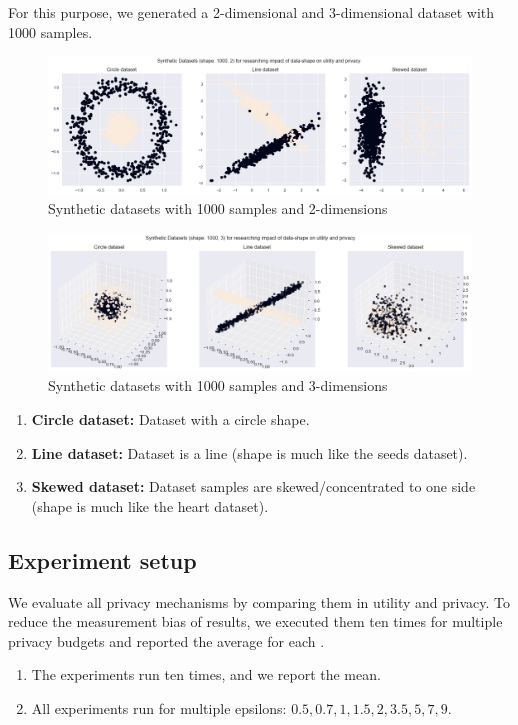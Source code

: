 For this purpose, we generated a 2-dimensional and 3-dimensional dataset with 1000 samples.
\begin{figure}[H]
      \includegraphics[width=1.0\textwidth]{Method/images/rq3.png}
      \caption{Synthetic datasets with 1000 samples and 2-dimensions}
      \label{rq3:synthetic-datasets}
\end{figure}
\begin{figure}[H]
      \includegraphics[width=1.0\textwidth]{Method/images/rq3-3d-synth.png}
      \caption{Synthetic datasets with 1000 samples and 3-dimensions}
      \label{rq3:synthetic-datasets-3d}
\end{figure}

\begin{enumerate}
      \item \textbf{Circle dataset:} Dataset with a circle shape.
      \item \textbf{Line dataset:} Dataset is a line (shape is much like the seeds dataset).
      \item \textbf{Skewed dataset:} Dataset samples are skewed/concentrated to one side (shape is much like the heart dataset).
\end{enumerate}

\subsection{Experiment setup}
We evaluate all privacy mechanisms by comparing them in utility and privacy.
To reduce the measurement bias of results, we executed them ten times for multiple privacy budgets and reported the average for each \citep{9679364}.
\begin{enumerate}
      \item The experiments run ten times, and we report the mean.
      \item All experiments run for multiple epsilons: ${0.5, 0.7, 1, 1.5, 2, 3.5, 5, 7, 9}$.
\end{enumerate}
\newpage

